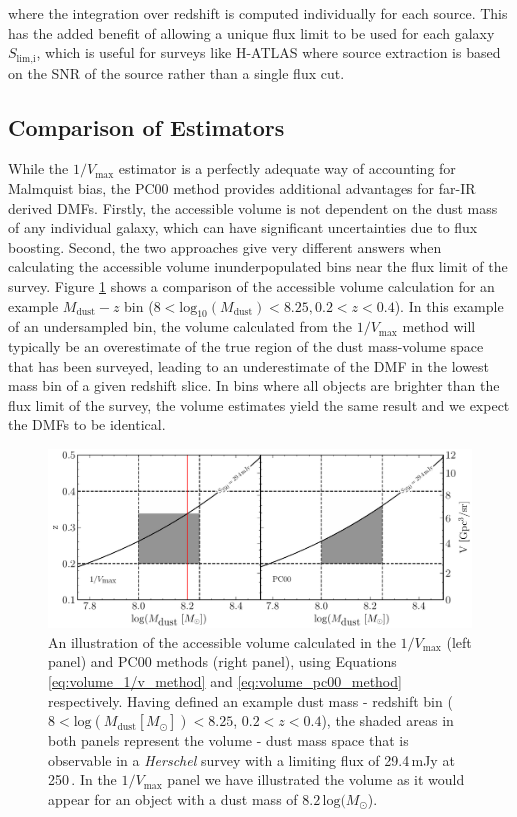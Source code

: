 \noindent where the integration over redshift is computed individually for each source. This has the added benefit of allowing a unique flux limit to be used for each galaxy $S_{\textrm{lim,i}}$, which is useful for surveys like H-ATLAS where source extraction is based on the SNR of the source rather than a single flux cut.

\subsection{Comparison of Estimators}

While the $1/V_{\textrm{max}}$ estimator is a perfectly adequate way of accounting for Malmquist bias, the PC00 method provides additional advantages for far-IR derived DMFs. Firstly, the accessible volume is not dependent on the dust mass of any individual galaxy, which can have significant uncertainties due to flux boosting. Second, the two approaches give very different answers when calculating the accessible volume inunderpopulated bins near the flux limit of the survey. Figure \ref{fig:volume_comparison} shows a comparison of the accessible volume calculation for an example $M_{\textrm{dust}} - z$ bin ($8 < \textrm{log}_{10}(M_\textrm{dust}) < 8.25, 0.2 < z < 0.4$). In this example of an undersampled bin, the volume calculated from the $1/V_{\textrm{max}}$ method will typically be an overestimate of the true region of the dust mass-volume space that has been surveyed, leading to an underestimate of the DMF in the lowest mass bin of a given redshift slice. In bins where all objects are brighter than the flux limit of the survey, the volume estimates yield the same result and we expect the DMFs to be identical.

\begin{figure}
	\centering
	\includegraphics[width=\columnwidth]{Figures/volume_comparison.pdf}
	\caption[Example dust mass - redshift bin for the $1/V_{\textrm{max}}$ and PC00 methods]{An illustration of the accessible volume calculated in the $1/V_{\textrm{max}}$ (left panel) and PC00 methods (right panel), using Equations \ref{eq:volume_1/v_method} and \ref{eq:volume_pc00_method} respectively. Having defined an example dust mass - redshift bin ($8 < \textrm{log}(M_{\textrm{dust}} [M_{\odot}]) < 8.25$, $0.2 < z < 0.4$), the shaded areas in both panels represent the volume - dust mass space that is observable in a \textit{Herschel} survey with a limiting flux of 29.4\,mJy at 250\,\micron. In the $1/V_{\textrm{max}}$ panel we have illustrated the volume as it would appear for an object with a dust mass of $8.2\,\textrm{log}(M_{\odot}$).}
	\label{fig:volume_comparison}
\end{figure}

